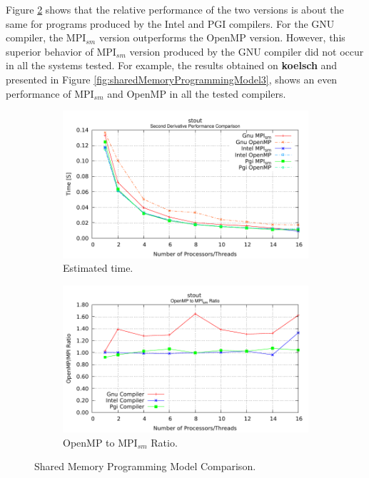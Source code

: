 \medskip

Figure \ref{fig:sharedMemoryRatioComparison2} shows that the relative performance of the two versions is about the same for programs produced by the Intel and PGI compilers. For the GNU compiler, the MPI$_{sm}$ version outperforms the OpenMP version. However, this superior behavior of MPI$_{sm}$ version produced by the GNU compiler did not occur in all the systems tested. For example, the results obtained on \textbf{koelsch} and presented in Figure \ref{fig:sharedMemoryProgrammingModel3}, shows an even performance of MPI$_{sm}$ and OpenMP in all the tested compilers.


\begin{figure} [t!]
    \centering
    \captionsetup{justification=centering, singlelinecheck=false}
    \begin{subfigure}{.6\textwidth}
      \centering
      \hspace*{-1.5cm} 
      \includegraphics[width=0.95\linewidth]{Plots/FirstTouch/stout.pdf}
      \caption[]{Estimated time.}
      \label{fig:sharedMemoryComparison2}
    \end{subfigure}%
    \begin{subfigure}{.6\textwidth}
      \centering
      \hspace*{-1.5cm} 
      \includegraphics[width=0.95\linewidth]{Plots/FirstTouch/stoutRatio.pdf}
      \caption{OpenMP to MPI$_{sm}$ Ratio.}
      \label{fig:sharedMemoryRatioComparison2}
    \end{subfigure}%
\caption{Shared Memory Programming Model Comparison.}
\label{fig:sharedMemoryProgrammingModel2}
\end{figure}



